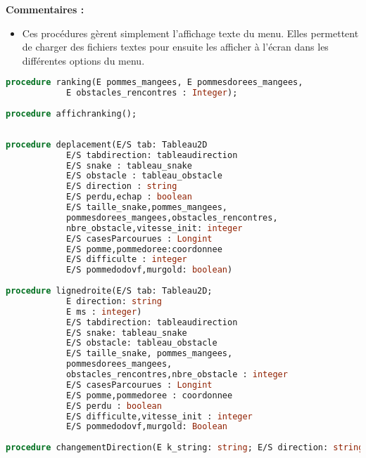             \textbf {Commentaires : } 
                \begin{itemize}
                
                    \item Ces procédures gèrent simplement l'affichage texte du menu. Elles permettent de charger des fichiers textes pour ensuite les afficher à l'écran dans les différentes options du menu. 
                    
                \end{itemize}
                
            \clearpage
            
            \begin{lstlisting}[language=Pascal,frame=single,caption=Signatures des procédures de l'unité ranking]
procedure ranking(E pommes_mangees, E pommesdorees_mangees,
            E obstacles_rencontres : Integer);
            
procedure affichranking();
            
            \end{lstlisting}

            \begin{lstlisting}[language=Pascal,frame=single,caption=Signatures des procédures de l'unité deplacement]
procedure deplacement(E/S tab: Tableau2D
            E/S tabdirection: tableaudirection
            E/S snake : tableau_snake
            E/S obstacle : tableau_obstacle
            E/S direction : string
            E/S perdu,echap : boolean
            E/S taille_snake,pommes_mangees,
            pommesdorees_mangees,obstacles_rencontres,
            nbre_obstacle,vitesse_init: integer
            E/S casesParcourues : Longint
            E/S pomme,pommedoree:coordonnee
            E/S difficulte : integer
            E/S pommedodovf,murgold: boolean)
                                  
procedure lignedroite(E/S tab: Tableau2D; 
            E direction: string
            E ms : integer)
            E/S tabdirection: tableaudirection
            E/S snake: tableau_snake
            E/S obstacle: tableau_obstacle
            E/S taille_snake, pommes_mangees,
            pommesdorees_mangees, 
            obstacles_rencontres,nbre_obstacle : integer
            E/S casesParcourues : Longint
            E/S pomme,pommedoree : coordonnee
            E/S perdu : boolean
            E/S difficulte,vitesse_init : integer
            E/S pommedodovf,murgold: Boolean
                                    
procedure changementDirection(E k_string: string; E/S direction: string )
            
            \end{lstlisting}

